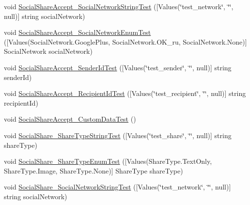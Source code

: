 \begin{DoxyCompactItemize}
\item 
void \mbox{\hyperlink{class_unity_engine_1_1_analytics_1_1_tests_1_1_analytics_event_tests_a69632fdbcfc811b783a1fb23be953a3f}{Social\+Share\+Accept\+\_\+\+Social\+Network\+String\+Test}} (\mbox{[}Values(\char`\"{}test\+\_\+network\char`\"{}, \char`\"{}\char`\"{}, null)\mbox{]} string social\+Network)
\item 
void \mbox{\hyperlink{class_unity_engine_1_1_analytics_1_1_tests_1_1_analytics_event_tests_a549c2af1dd09390a42b46f690f7f0e79}{Social\+Share\+Accept\+\_\+\+Social\+Network\+Enum\+Test}} (\mbox{[}Values(Social\+Network.\+Google\+Plus, Social\+Network.\+O\+K\+\_\+ru, Social\+Network.\+None)\mbox{]} Social\+Network social\+Network)
\item 
void \mbox{\hyperlink{class_unity_engine_1_1_analytics_1_1_tests_1_1_analytics_event_tests_aea1688869f9bd758625b629261cd6b2d}{Social\+Share\+Accept\+\_\+\+Sender\+Id\+Test}} (\mbox{[}Values(\char`\"{}test\+\_\+sender\char`\"{}, \char`\"{}\char`\"{}, null)\mbox{]} string sender\+Id)
\item 
void \mbox{\hyperlink{class_unity_engine_1_1_analytics_1_1_tests_1_1_analytics_event_tests_a0247a45f6178b3926344d2e93ebc8a2f}{Social\+Share\+Accept\+\_\+\+Recipient\+Id\+Test}} (\mbox{[}Values(\char`\"{}test\+\_\+recipient\char`\"{}, \char`\"{}\char`\"{}, null)\mbox{]} string recipient\+Id)
\item 
void \mbox{\hyperlink{class_unity_engine_1_1_analytics_1_1_tests_1_1_analytics_event_tests_abfa1261f2bd4a4e9284338210d65f2ba}{Social\+Share\+Accept\+\_\+\+Custom\+Data\+Test}} ()
\item 
void \mbox{\hyperlink{class_unity_engine_1_1_analytics_1_1_tests_1_1_analytics_event_tests_a84df533b90b902d605ec4cebb27879bf}{Social\+Share\+\_\+\+Share\+Type\+String\+Test}} (\mbox{[}Values(\char`\"{}test\+\_\+share\char`\"{}, \char`\"{}\char`\"{}, null)\mbox{]} string share\+Type)
\item 
void \mbox{\hyperlink{class_unity_engine_1_1_analytics_1_1_tests_1_1_analytics_event_tests_a532b6dbee6982c5e8af220e5e63c7c0e}{Social\+Share\+\_\+\+Share\+Type\+Enum\+Test}} (\mbox{[}Values(Share\+Type.\+Text\+Only, Share\+Type.\+Image, Share\+Type.\+None)\mbox{]} Share\+Type share\+Type)
\item 
void \mbox{\hyperlink{class_unity_engine_1_1_analytics_1_1_tests_1_1_analytics_event_tests_a43c76a1070c1e7ff8fecbc164d3f6559}{Social\+Share\+\_\+\+Social\+Network\+String\+Test}} (\mbox{[}Values(\char`\"{}test\+\_\+network\char`\"{}, \char`\"{}\char`\"{}, null)\mbox{]} string social\+Network)

\end{DoxyCompactItemize}
